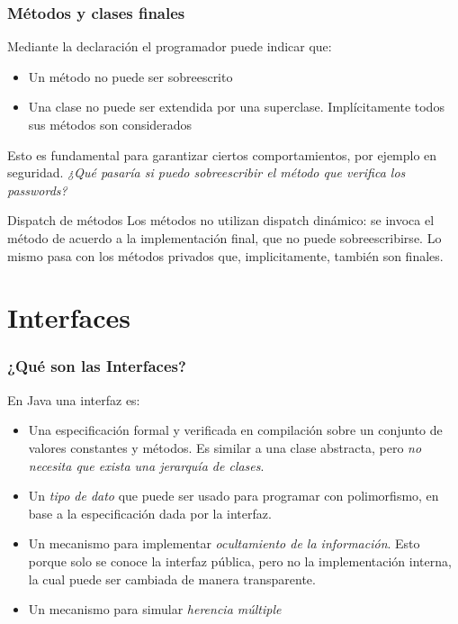 \documentclass{beamer}
\begin{document}
\begin{frame}
  \frametitle{Métodos y clases finales}

  Mediante la declaración  el programador puede indicar
  que:

  \begin{itemize}

  \item Un método no puede ser sobreescrito

  \item Una clase no puede ser extendida por una
    superclase. Implícitamente todos sus métodos son considerados 
    
  \end{itemize}

  Esto es fundamental para garantizar ciertos comportamientos, por
  ejemplo en seguridad. \emph{¿Qué pasaría si puedo sobreescribir el
    método que verifica los passwords?}

  \begin{block}{Dispatch de métodos }
    Los métodos  no utilizan dispatch dinámico: se invoca
    el método de acuerdo a la implementación final, que no puede
    sobreescribirse. Lo mismo pasa con los métodos privados que,
    implicitamente, también son finales.
  \end{block}  
  
\end{frame}

\section{Interfaces}

\begin{frame}
  \frametitle{¿Qué son las Interfaces?}

  En Java una interfaz es:

  \begin{itemize}

  \item Una especificación formal y verificada en compilación sobre un
    conjunto de valores constantes y métodos. Es similar a una clase
    abstracta, pero \emph{no necesita que exista una jerarquía de
      clases}.
    
  \item Un \emph{tipo de dato} que puede ser usado para programar con
    polimorfismo, en base a la especificación dada por la interfaz.
    
  \item Un mecanismo para implementar \emph{ocultamiento de la
      información}. Esto porque solo se conoce la interfaz pública,
    pero no la implementación interna, la cual puede ser cambiada de
    manera transparente.
    
  \item Un mecanismo para simular \emph{herencia múltiple}
    
  \end{itemize}
  
\end{frame}
\end{document}
